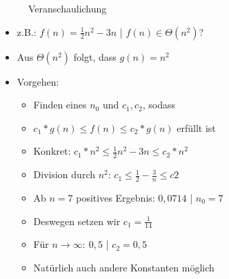 \documentclass[
    12pt,
    a4paper,
    ngerman,
    color=3b,%
    marginpar=false,
    colorback=false,
    leqno,
]{tudaexercise}
\begin{document}
\begin{itemize}
\begin{itemize}
\begin{minipage}{0.3\textwidth}
\begin{figure}[H]
                            \caption{Veranschaulichung}
                            \label{}
                        \end{figure}
                    \end{minipage}
                    \begin{minipage}[t]{0.6\textwidth}
                        \vspace{-3cm}
                        \begin{itemize}
                            \item z.B.: $f(n)= \frac{1}{2} n^2 - 3n$ | $f(n) \in \Theta(n^2)$?
                            \item Aus $\Theta(n^2)$ folgt, dass $g(n)=n^2$
                            \item Vorgehen:
                                  \begin{itemize}
                                      \item Finden eines $n_0$ und $c_1,c_2$, sodass
                                      \item $c_1*g(n) \leq f(n) \leq c_2*g(n)$ erfüllt ist
                                      \item Konkret: $c_1*n^2 \leq \frac{1}{2} n^2 - 3n \leq c_2*n^2$
                                      \item Division durch $n^2$: $c_1 \leq \frac{1}{2}-\frac{3}{n} \leq c2$
                                      \item Ab $n=7$ positives Ergebnis: $0,0714$ | $n_0 = 7$
                                      \item Deswegen setzen wir $c_1=\frac{1}{14}$
                                      \item Für $n \rightarrow \infty: ~ 0,5$ | $c_2 = 0,5$
                                      \item Natürlich auch andere Konstanten möglich
                                  \end{itemize}
                        \end{itemize}
                    \end{minipage}
          \end{itemize}

          \pagebreak


\end{itemize}
\end{document}
